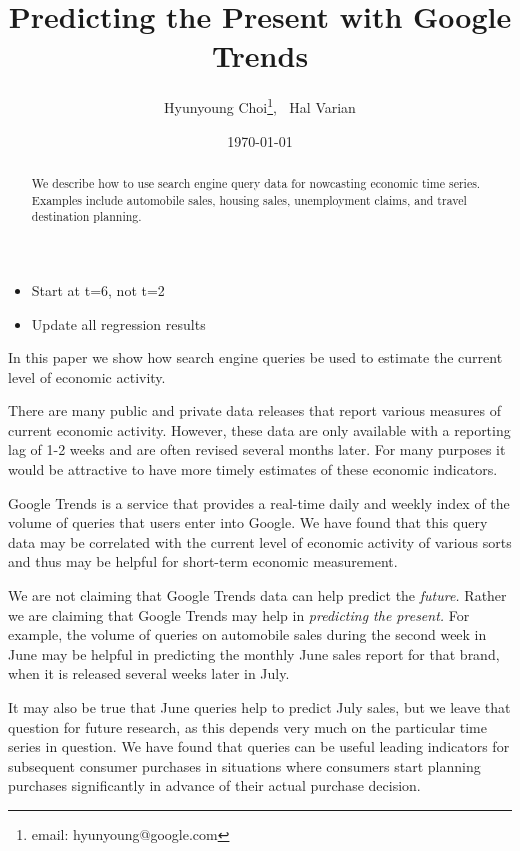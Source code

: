 \documentclass[12pt, oneside]{article}
\begin{document}
\title{Predicting the Present with Google Trends}
\author{Hyunyoung Choi\footnote{email: hyunyoung@google.com},   $~$  Hal Varian} 
\date{\today}

\maketitle

\begin{abstract}\noindent We describe how to use search engine query
  data for nowcasting economic time series.  Examples include
  automobile sales, housing sales, unemployment claims, and travel
  destination planning.
\end{abstract}

\newpage

\begin{itemize}
\item Start at t=6, not t=2
\item Update all regression results
\end{itemize}

\noindent In this paper we show how search engine queries be used to estimate
the current level of economic activity.

There are many public and private data releases that report various
measures of current economic activity.  However, these data
are only available with a reporting lag of 1-2 weeks and are often
revised several months later.  For many purposes it would be
attractive to have more timely estimates of these economic indicators.


Google Trends is a service that provides a real-time daily and weekly
index of the volume of queries that users enter into Google.  We have
found that this query data may be correlated with the current
level of economic activity of various sorts and thus may be helpful
for short-term economic measurement.

We are not claiming that Google Trends data can help predict the {\it
  future.\/} Rather we are claiming that Google Trends may help in
{\it predicting the present.}  For example, the volume of queries on
automobile sales during the second week in June may be helpful in
predicting the monthly June sales report for that brand, when it is
released several weeks later in July.

It may also be true that June queries help to predict July sales, but
we leave that question for future research, as this depends very much
on the particular time series in question.  We have found that queries
can be useful leading indicators for subsequent consumer purchases in
situations where consumers start planning purchases significantly in
advance of their actual purchase decision.
\end{document}
